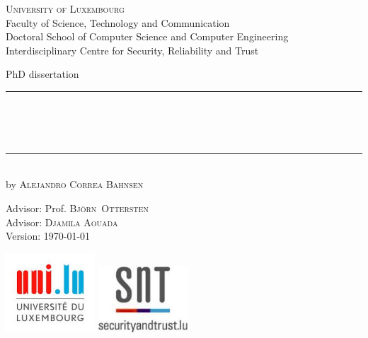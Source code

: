 
\begin{titlepage}
	\begin{addmargin}[-1cm]{-3cm}
    \begin{center}
        \large
        {\Large \textsc{University of Luxembourg}}\\[1ex]
        Faculty of Science, Technology and Communication\\
        Doctoral School of Computer Science and Computer Engineering\\
				Interdisciplinary Centre for Security, Reliability and Trust\\

        \vfill

        PhD dissertation\\ \vskip1cm
        \rule{15cm}{0.4pt}\\ \bigskip
        \begingroup
            \Large
            \color{Maroon} \\ 
						\bigskip
        \endgroup
        \\
        \bigskip
        \rule{15cm}{0.4pt}\\ \vskip1cm
        by \textsc{Alejandro Correa Bahnsen}

        \vfill

        \hfill Advisor: Prof. \textsc{Bj\"orn~Ottersten}\\
				\hfill Advisor: \textsc{Djamila Aouada}\\
        \hfill Version: \today
			  \vspace{1.5cm}
    \end{center}
    \vspace{-3.5cm}\includegraphics[width=0.25\textwidth]{figures/logo_unilu}
    \includegraphics[width=0.25\textwidth]{figures/logo_snt}
  \end{addmargin}
\end{titlepage}
